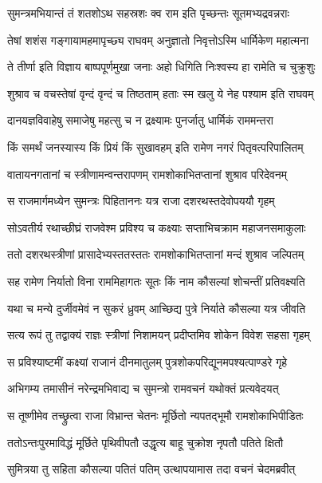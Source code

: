 \twolineshloka
{सुमन्त्रमभियान्तं तं शतशोऽथ सहस्रशः}
{क्व राम इति पृच्छन्तः सूतमभ्यद्रवन्नराः} %

\twolineshloka
{तेषां शशंस गङ्गायामहमापृच्छ्य राघवम्}
{अनुज्ञातो निवृत्तोऽस्मि धार्मिकेण महात्मना} %

\twolineshloka
{ते तीर्णा इति विज्ञाय बाष्पपूर्णमुखा जनाः}
{अहो धिगिति निःश्वस्य हा रामेति च चुक्रुशुः} %

\twolineshloka
{शुश्राव च वचस्तेषां वृन्दं वृन्दं च तिष्ठताम्}
{हताः स्म खलु ये नेह पश्याम इति राघवम्} %

\twolineshloka
{दानयज्ञविवाहेषु समाजेषु महत्सु च}
{न द्रक्ष्यामः पुनर्जातु धार्मिकं राममन्तरा} %

\twolineshloka
{किं समर्थं जनस्यास्य किं प्रियं किं सुखावहम्}
{इति रामेण नगरं पितृवत्परिपालितम्} %

\twolineshloka
{वातायनगतानां च स्त्रीणामन्वन्तरापणम्}
{रामशोकाभितप्तानां शुश्राव परिदेवनम्} %

\twolineshloka
{स राजमार्गमध्येन सुमन्त्रः पिहिताननः}
{यत्र राजा दशरथस्तदेवोपययौ गृहम्} %

\twolineshloka
{सोऽवतीर्य रथाच्छीघ्रं राजवेश्म प्रविश्य च}
{कक्ष्याः सप्ताभिचक्राम महाजनसमाकुलाः} %

\twolineshloka
{ततो दशरथस्त्रीणां प्रासादेभ्यस्ततस्ततः}
{रामशोकाभितप्तानां मन्दं शुश्राव जल्पितम्} %

\twolineshloka
{सह रामेण निर्यातो विना राममिहागतः}
{सूतः किं नाम कौसल्यां शोचन्तीं प्रतिवक्ष्यति} %

\twolineshloka
{यथा च मन्ये दुर्जीवमेवं न सुकरं ध्रुवम्}
{आच्छिद्य पुत्रे निर्याते कौसल्या यत्र जीवति} %

\twolineshloka
{सत्य रूपं तु तद्वाक्यं राज्ञः स्त्रीणां निशामयन्}
{प्रदीप्तमिव शोकेन विवेश सहसा गृहम्} %

\twolineshloka
{स प्रविश्याष्टमीं कक्ष्यां राजानं दीनमातुलम्}
{पुत्रशोकपरिद्यूनमपश्यत्पाण्डरे गृहे} %

\twolineshloka
{अभिगम्य तमासीनं नरेन्द्रमभिवाद्य च}
{सुमन्त्रो रामवचनं यथोक्तं प्रत्यवेदयत्} %

\twolineshloka
{स तूष्णीमेव तच्छ्रुत्वा राजा विभ्रान्त चेतनः}
{मूर्छितो न्यपतद्भूमौ रामशोकाभिपीडितः} %

\twolineshloka
{ततोऽन्तःपुरमाविद्धं मूर्छिते पृथिवीपतौ}
{उद्धृत्य बाहू चुक्रोश नृपतौ पतिते क्षितौ} %

\twolineshloka
{सुमित्रया तु सहिता कौसल्या पतितं पतिम्}
{उत्थापयामास तदा वचनं चेदमब्रवीत्} %

